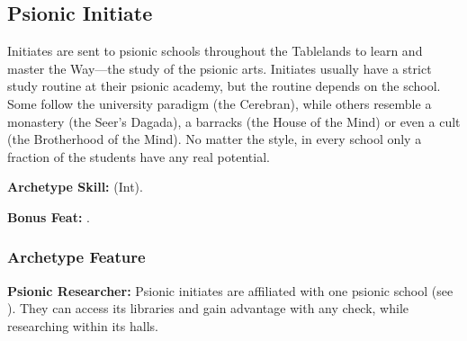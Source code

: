 \subsection{Psionic Initiate}
Initiates are sent to psionic schools throughout the Tablelands to learn and master the Way---the study of the psionic arts. Initiates usually have a strict study routine at their psionic academy, but the routine depends on the school. Some follow the university paradigm (the Cerebran), while others resemble a monastery (the Seer's Dagada), a barracks (the House of the Mind) or even a cult (the Brotherhood of the Mind). No matter the style, in every school only a fraction of the students have any real potential.

\textbf{Archetype Skill:}  (Int).

\textbf{Bonus Feat:} .

\subsubsection{Archetype Feature}
\textbf{Psionic Researcher:} Psionic initiates are affiliated with one psionic school (see ). They can access its libraries and gain advantage with any  check, while researching within its halls.
